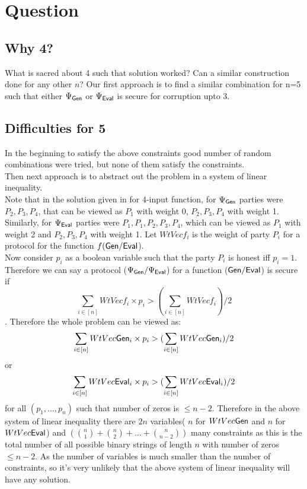 \section{Question}
\subsection{Why 4?}
What is sacred about 4 such that solution worked? Can a similar construction done for any other $n$? Our first approach is to find a similar combination for n=5 such that either $\Psi_{\mathsf{Gen}}$ or $\Psi_{\mathsf{Eval}}$ is secure for corruption upto 3.
\subsection{Difficulties for 5}
In the beginning to satisfy the above constraints good number of random combinations were tried, but none of them satisfy the constraints.\\ %
Then next approach is to abstract out the problem in a system of linear inequality.\\
Note that in the solution given in \cite{BITMPC} for 4-input function, for $\Psi_{\mathsf{Gen}}$ parties were $P_2,P_3,P_4$, that can be viewed as $P_1$ with weight 0, $P_2,P_3,P_4$ with weight 1. Similarly, for $\Psi_{\mathsf{Eval}}$ parties were $P_1, P_1, P_2,P_3,P_4$, which can be viewed as $P_1$ with weight 2 and $P_2,P_3,P_4$ with weight 1. Let $WtVecf_i$ is the weight of party $P_i$ for a protocol for the function $f(\mathsf{Gen}/\mathsf{Eval}$).\\
Now consider $p_i$ as a boolean variable such that the party $P_i$ is honest iff $p_i=1$. Therefore we can say a protocol ($\Psi_{\mathsf{Gen}}/\Psi_{\mathsf{Eval}}$) for a function ($\mathsf{Gen} /\mathsf{Eval}$) is secure if 
$$ \sum_{i\in[n]} WtVecf_i \times p_i > (\sum_{i\in[n]} WtVecf_i)/2$$.
Therefore the whole problem can be viewed as:
$$ \sum_{i\in[n]} WtVec\mathsf{Gen}_i \times p_i > (\sum_{i\in[n]} WtVec\mathsf{Gen}_i)/2$$ or
$$ \sum_{i\in[n]} WtVec\mathsf{Eval}_i \times p_i > (\sum_{i\in[n]} WtVec\mathsf{Eval}_i)/2$$
for all $(p_1,\ldots, p_n)$ such that number of zeros is $\leq n-2$.
Therefore in the above system of linear inequality there are $2n$ variables( $n$ for $WtVec\mathsf{Gen}$ and $n$ for $WtVec\mathsf{Eval}$) and $(\binom{n}{1} + \binom{n}{2} +  \ldots + \binom{n}{n-2})$ many constraints as this is the total number of all possible binary strings of length $n$ with number of zeros $\leq n-2$.
As the number of variables is much smaller than the number of constraints, so it's very unlikely that the above system of linear inequality will have any solution.\\
